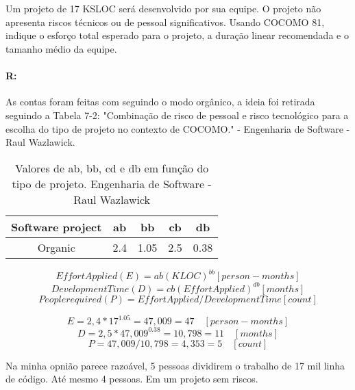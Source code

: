 \documentclass[10pt, a4paper]{report}
\begin{document}
\section{}

\qquad Um projeto de 17 KSLOC será desenvolvido por sua equipe. O projeto não
apresenta riscos técnicos ou de pessoal significativos. Usando COCOMO 81,
indique o esforço total esperado para o projeto, a duração linear recomendada e
o tamanho médio da equipe.

\paragraph{R:}

As contas foram feitas com seguindo o modo orgânico, a ideia foi retirada
seguindo a Tabela 7-2: "Combinação de risco de pessoal e risco tecnológico para
a escolha do tipo de projeto no contexto de COCOMO." - Engenharia de Software -
Raul Wazlawick.

\begin{table}[ht!]
  \centering
  \begin{tabular}{|c|c|c|c|c|}
    \hline Software project & ab & bb & cb & db \\
    \hline Organic & 2.4 & 1.05 & 2.5 & 0.38 \\
    \hline
  \end{tabular}
  \caption{Valores de ab, bb, cd e db em função do tipo de projeto. Engenharia
  de Software - Raul Wazlawick}
\end{table}

$$ Effort Applied (E) = ab(KLOC)^{bb} [ person-months ] $$
$$ Development Time (D) = cb(Effort Applied)^{db} [months] $$
$$ People required (P) = Effort Applied / Development Time [count] $$

$$ E = 2,4*17^{1.05} = 47,009 = 47 \quad [person-months] $$
$$ D = 2,5*47,009^{0.38} = 10,798 = 11 \quad [months] $$
$$ P = 47,009 / 10,798 = 4,353 = 5 \quad [count] $$

Na minha opnião parece razoável, 5 pessoas dividirem o trabalho de 17 mil linha de código. Até mesmo 4 pessoas. Em um projeto sem riscos.

\section{}
\end{document}
